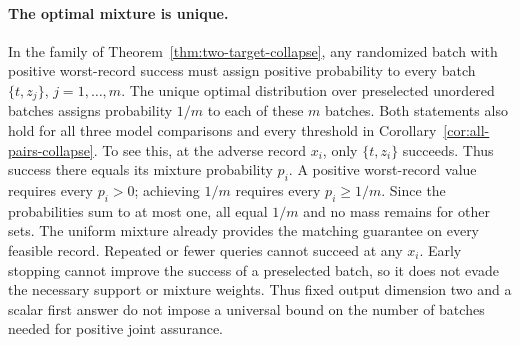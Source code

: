\paragraph{The optimal mixture is unique.}
In the family of Theorem~\ref{thm:two-target-collapse}, any randomized
batch with positive worst-record success must assign positive probability
to every batch $\{t,z_j\}$, $j=1,\ldots,m$. The unique optimal distribution
over preselected unordered batches assigns probability $1/m$ to each of these
$m$ batches. Both statements also hold for all three model comparisons and
every threshold in Corollary~\ref{cor:all-pairs-collapse}.
To see this, at the adverse record $x_i$, only $\{t,z_i\}$ succeeds.
Thus success there equals its mixture probability $p_i$. A positive
worst-record value requires every $p_i>0$; achieving $1/m$ requires every
$p_i\geq1/m$. Since the probabilities sum to at most one, all equal
$1/m$ and no mass remains for other sets. The uniform mixture already
provides the matching guarantee on every feasible record.
Repeated or fewer queries cannot succeed at any $x_i$. Early stopping
cannot improve the success of a preselected batch, so it does not evade
the necessary support or mixture weights. Thus fixed output dimension two
and a scalar first answer do not impose a universal bound on the number
of batches needed for positive joint assurance.
